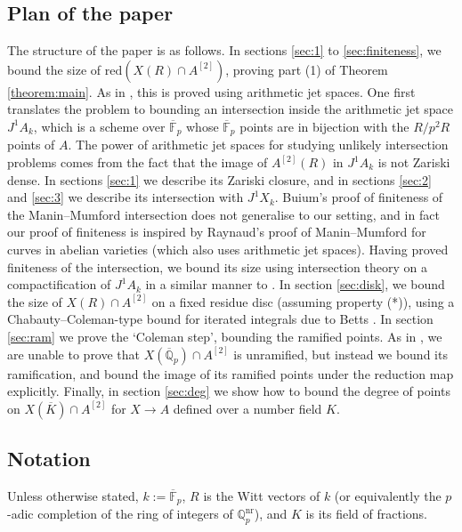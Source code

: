\documentclass[11pt]{amsart}
\def\Q{\mathbb Q}
\theoremstyle{plain}
\theoremstyle{definition}
\newcommand{\nr}{\mathrm{nr}}
\newcommand{\F}{\mathbb{F}}
\newcommand{\red}{\mathrm{red}}
\begin{document}
\subsection{Plan of the paper}
The structure of the paper is as follows. In sections \ref{sec:1} to \ref{sec:finiteness}, we bound the size of $\red (X(R)\cap A^{[2]})$, proving part (1) of Theorem \ref{theorem:main}. As in \cite{buium:96}, this is proved using arithmetic jet spaces. One first translates the problem to bounding an intersection inside the arithmetic jet space $J^1 A_k $, which is a scheme over $\overline{\F }_p $ whose $\overline{\F }_p $ points are in bijection with the $R/p^2 R$ points of $A$. The power of arithmetic jet spaces for studying unlikely intersection problems comes from the fact that the image of $A^{[2]}(R)$ in $J^1 A_k$ is not Zariski dense. In sections \ref{sec:1} we describe its Zariski closure, and in sections \ref{sec:2} and \ref{sec:3} we describe its intersection with $J^1 X_k$. Buium's proof of finiteness of the Manin--Mumford intersection does not generalise to our setting, and in fact our proof of finiteness is inspired by Raynaud's proof of Manin--Mumford for curves in abelian varieties \cite{raynaud} (which also uses arithmetic jet spaces). Having proved finiteness of the intersection, we bound its size using intersection theory on a compactification of $J^1 A_k$ in a similar manner to \cite{buium:96}. In section \ref{sec:disk}, we bound the size of $X(R)\cap A^{[2]}$ on a fixed residue disc (assuming property (*)), using a Chabauty--Coleman-type bound for iterated integrals due to Betts \cite{betts:weight}. In section \ref{sec:ram} we prove the `Coleman step', bounding the ramified points. As in \cite{approaches}, we are unable to prove that $X(\overline{\Q }_p )\cap A^{[2]}$ is unramified, but instead we bound its ramification, and bound the image of its ramified points under the reduction map explicitly. Finally, in section \ref{sec:deg} we show how to bound the degree of points on $X(\overline{K})\cap A^{[2]}$ for $X\to A$ defined over a number field $K$.

\subsection{Notation}
Unless otherwise stated, $k:=\overline{\F }_p $, $R$ is the Witt vectors of $k$ (or equivalently the $p$-adic completion of the ring of integers of $\Q _p ^{\nr }$), and $K$ is its field of fractions. 
\end{document}
